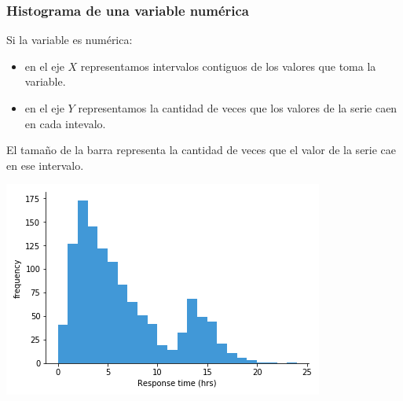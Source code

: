 \documentclass[aspectratio=169,12pt]{beamer}
\begin{document}
\begin{frame}
\frametitle{Histograma de una variable numérica}

\begin{minipage}{.55\textwidth}
Si la variable es numérica:
\begin{itemize}
\item en el eje $X$ representamos intervalos contiguos de los valores que toma la variable.
\item en el eje $Y$ representamos la cantidad de veces que los valores de la serie caen en cada intevalo.
\end{itemize}

El tamaño de la barra representa la cantidad de veces que el valor de la serie cae en ese intervalo.

\end{minipage} \hspace{1cm} %
\begin{minipage}{.35\textwidth}
\begin{center}
\includegraphics[scale=1.5]{clase4-histogram-example-1.png}
\end{center}
\end{minipage}


\end{frame}


\end{document}
